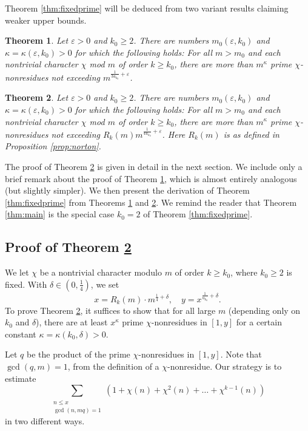 \documentclass{scrartcl}
\theoremstyle{plain}
\newtheorem{thm}{Theorem}[section]
\theoremstyle{remark}
\newcommand{\1}{\mathbf{1}}
\begin{document}
Theorem \ref{thm:fixedprime} will be deduced from two variant results claiming weaker upper bounds.

\begin{thm}\label{thm:fixedprime0} Let $\varepsilon >0$ and $k_0 \ge 2$. There are numbers $m_0(\varepsilon,k_0)$ and $\kappa = \kappa(\varepsilon,k_0) > 0$ for which the following holds: For all $m > m_0$ and each nontrivial character $\chi$ mod $m$ of order $k \ge k_0$, there are more than $m^{\kappa}$ prime $\chi$-nonresidues not exceeding $m^{\frac{1}{3u_{k_0}}+\varepsilon}$.\end{thm}


\begin{thm}\label{thm:fixedprime1} Let $\varepsilon >0$ and $k_0 \ge 2$. There are numbers $m_0(\varepsilon,k_0)$ and $\kappa = \kappa(\varepsilon,k_0) > 0$ for which the following holds: For all $m > m_0$ and each nontrivial character $\chi$ mod $m$ of order $k \ge k_0$, there are more than $m^{\kappa}$ prime $\chi$-nonresidues not exceeding $R_k(m) m^{\frac{1}{4u_{k_0}}+\varepsilon}$. Here $R_k(m)$ is as defined in Proposition \ref{prop:norton}.
\end{thm}

The proof of Theorem \ref{thm:fixedprime1} is given in detail in the next section. We include only a brief remark about the proof of Theorem \ref{thm:fixedprime0}, which is almost entirely analogous (but slightly simpler). We then present the derivation of Theorem \ref{thm:fixedprime} from Theorems \ref{thm:fixedprime0} and \ref{thm:fixedprime1}. We remind the reader that Theorem \ref{thm:main} is the special case $k_0=2$ of Theorem \ref{thm:fixedprime}.

\subsection{Proof of Theorem \ref{thm:fixedprime1}}\label{sec:proofs} We let $\chi$ be a nontrivial character modulo $m$ of order $k \ge k_0$, where $k_0 \ge 2$ is fixed. With $\delta \in (0,\frac{1}{4})$, we set
\[ x= R_k(m) \cdot m^{\frac14 + \delta}, \quad y = x^{\frac{1}{u_{k_0}} + \delta}. \]
To prove Theorem \ref{thm:fixedprime1}, it suffices to show that for all large $m$ (depending only on $k_0$ and $\delta$), there are at least $x^{\kappa}$ prime $\chi$-nonresidues in $[1,y]$ for a certain constant $\kappa = \kappa(k_0,\delta) > 0$.

Let $q$ be the product of the prime $\chi$-nonresidues in $[1,y]$. Note that $\gcd(q,m)=1$, from the definition of a $\chi$-nonresidue.
Our strategy is to estimate
\begin{equation}\label{eq:different} \sum_{\substack{n \le x \\ \gcd(n,mq)=1}} (1+\chi(n) + \chi^2(n) + \dots + \chi^{k-1}(n)) \end{equation}
in two different ways.
\end{document}
